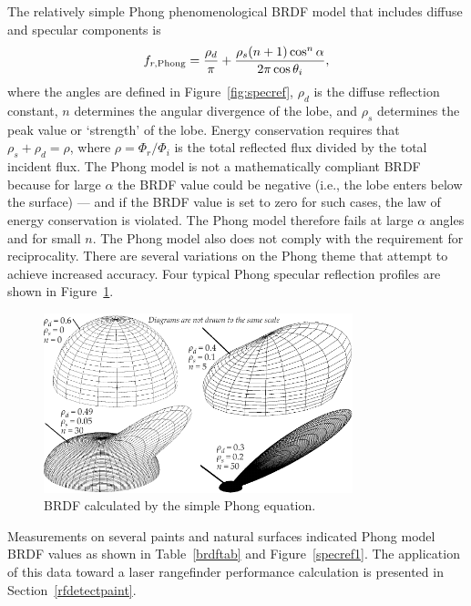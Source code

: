 The relatively simple Phong phenomenological BRDF model that includes diffuse and specular components is
\begin{equation}
f_{r,{\rm Phong}} = \frac{\rho_d}{\pi} + \frac{\rho_s(n+1)\cos^n\alpha}{2\pi\cos\theta_i},
\label{eq:BRDFequationPhong}
\end{equation}
where the angles are defined in Figure~\ref{fig:specref},
$\rho_d$ is the diffuse reflection constant,
$n$ determines the angular divergence of the lobe, and $\rho_s$ determines the peak value or `strength' of the lobe. Energy conservation requires that $\rho_s + \rho_d = \rho$, where $\rho=\Phi_r/\Phi_i$ is the total reflected flux divided by the total incident flux. The Phong model is not a  mathematically compliant BRDF because for large $\alpha$ the BRDF value could be negative (i.e., the lobe enters below the surface) --- and if the BRDF value is set to zero for such cases, the law of energy conservation is violated.  The Phong model therefore fails at large $\alpha$ angles and for small $n$. The Phong model also does not comply with the requirement for reciprocality.  There are several variations on the Phong theme that attempt to achieve increased accuracy.  Four typical Phong specular reflection profiles are shown in Figure~\ref{fig:brdfPhongProfiles}.


\begin{figure}[bt]
\centering
\includegraphics[width=0.8\textwidth]{pic/brdfPhongProfiles.pdf}
\caption{BRDF calculated by the simple Phong equation. \label{fig:brdfPhongProfiles}}
\end{figure}


Measurements on several paints and natural
surfaces\cite{Bergh2004} indicated Phong model BRDF values as shown in
Table~\ref{brdftab} and Figure~\ref{specref1}. The application of this data toward a laser rangefinder performance calculation is presented in Section~\ref{rfdetectpaint}.

